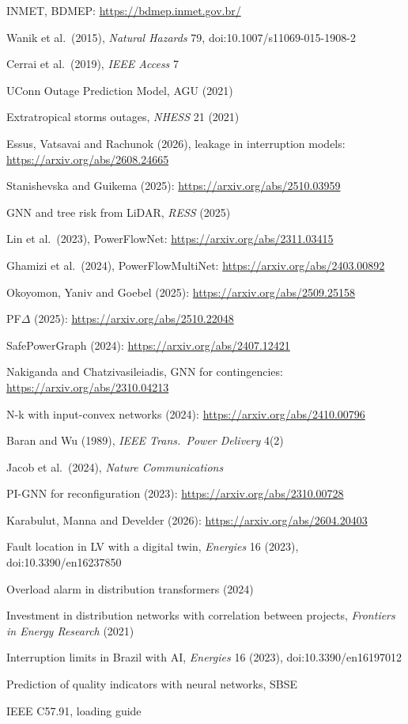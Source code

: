 {\begin{enumerate}[label={[\arabic*]},leftmargin=2.2em,itemsep=1pt]
\item INMET, BDMEP: \url{https://bdmep.inmet.gov.br/}
\item Wanik et al.\ (2015), \emph{Natural Hazards} 79, doi:10.1007/s11069-015-1908-2
\item Cerrai et al.\ (2019), \emph{IEEE Access} 7
\item UConn Outage Prediction Model, AGU (2021)
\item Extratropical storms outages, \emph{NHESS} 21 (2021)
\item Essus, Vatsavai and Rachunok (2026), leakage in interruption models: \url{https://arxiv.org/abs/2608.24665}
\item Stanishevska and Guikema (2025): \url{https://arxiv.org/abs/2510.03959}
\item GNN and tree risk from LiDAR, \emph{RESS} (2025)
\item Lin et al.\ (2023), PowerFlowNet: \url{https://arxiv.org/abs/2311.03415}
\item Ghamizi et al.\ (2024), PowerFlowMultiNet: \url{https://arxiv.org/abs/2403.00892}
\item Okoyomon, Yaniv and Goebel (2025): \url{https://arxiv.org/abs/2509.25158}
\item PF$\Delta$ (2025): \url{https://arxiv.org/abs/2510.22048}
\item SafePowerGraph (2024): \url{https://arxiv.org/abs/2407.12421}
\item Nakiganda and Chatzivasileiadis, GNN for contingencies: \url{https://arxiv.org/abs/2310.04213}
\item N-k with input-convex networks (2024): \url{https://arxiv.org/abs/2410.00796}
\item Baran and Wu (1989), \emph{IEEE Trans.\ Power Delivery} 4(2)
\item Jacob et al.\ (2024), \emph{Nature Communications}
\item PI-GNN for reconfiguration (2023): \url{https://arxiv.org/abs/2310.00728}
\item Karabulut, Manna and Develder (2026): \url{https://arxiv.org/abs/2604.20403}
\item Fault location in LV with a digital twin, \emph{Energies} 16 (2023), doi:10.3390/en16237850
\item Overload alarm in distribution transformers (2024)
\item Investment in distribution networks with correlation between projects, \emph{Frontiers in Energy Research} (2021)
\item Interruption limits in Brazil with AI, \emph{Energies} 16 (2023), doi:10.3390/en16197012
\item Prediction of quality indicators with neural networks, SBSE
\item IEEE C57.91, loading guide
\end{enumerate}}
